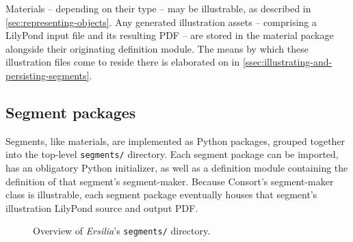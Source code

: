 Materials -- depending on their type -- may be illustrable, as described in
\autoref{sec:representing-objects}. Any generated illustration assets --
comprising a LilyPond input file and its resulting PDF -- are stored in the
material package alongside their originating definition module. The means by
which these illustration files come to reside there is elaborated on in
\autoref{ssec:illustrating-and-persisting-segments}.

\subsection{Segment packages}
\label{ssec:segment-packages}

Segments, like materials, are implemented as Python packages, grouped together
into the top-level \texttt{segments/} directory. Each segment package can be
imported, has an obligatory Python initializer, as well as a definition module
containing the definition of that segment's segment-maker. Because Consort's
segment-maker class is illustrable, each segment package eventually houses that
segment's illustration LilyPond source and output PDF.

\begin{figure}[h!]
\begin{singlespacing}
\vspace{-0.5\baselineskip}
\end{singlespacing}
\caption{Overview of \emph{Ersilia}'s \texttt{segments/} directory.}
\end{figure}


